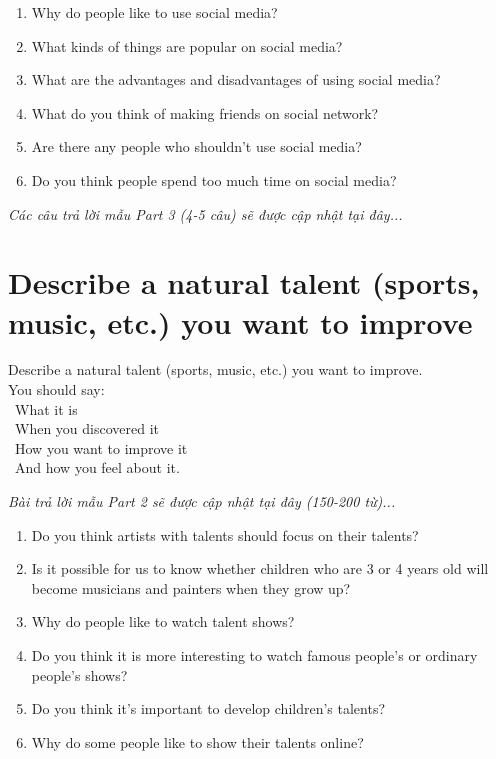 \begin{ieltsprompt}
\begin{enumerate}[itemsep=4pt]
    \item Why do people like to use social media?
    \item What kinds of things are popular on social media?
    \item What are the advantages and disadvantages of using social media?
    \item What do you think of making friends on social network?
    \item Are there any people who shouldn't use social media?
    \item Do you think people spend too much time on social media?
\end{enumerate}
\end{ieltsprompt}

\vspace{1em}
\textit{Các câu trả lời mẫu Part 3 (4-5 câu) sẽ được cập nhật tại đây...}
\vspace{2em}

\section{Describe a natural talent (sports, music, etc.) you want to improve}
\begin{ieltsprompt}
Describe a natural talent (sports, music, etc.) you want to improve. \\
You should say: \\
\textbullet\ What it is \\
\textbullet\ When you discovered it \\
\textbullet\ How you want to improve it \\
\textbullet\ And how you feel about it. \\
\end{ieltsprompt}

\vspace{1em}
\textit{Bài trả lời mẫu Part 2 sẽ được cập nhật tại đây (150-200 từ)...}
\vspace{2em}

\begin{ieltsprompt}
\begin{enumerate}[itemsep=4pt]
    \item Do you think artists with talents should focus on their talents?
    \item Is it possible for us to know whether children who are 3 or 4 years old will become musicians and painters when they grow up?
    \item Why do people like to watch talent shows?
    \item Do you think it is more interesting to watch famous people's or ordinary people's shows?
    \item Do you think it's important to develop children's talents?
    \item Why do some people like to show their talents online?
\end{enumerate}
\end{ieltsprompt}

